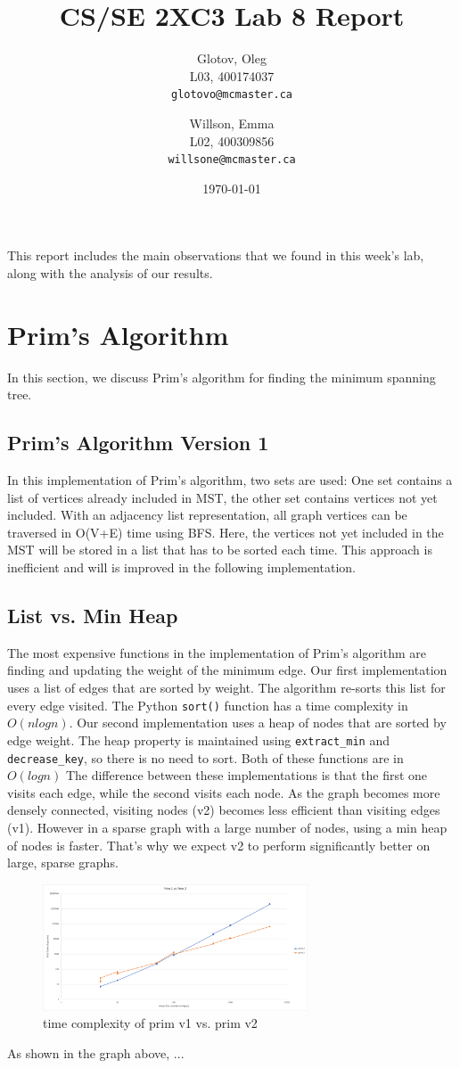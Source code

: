 \documentclass[12pt]{article}
\title{CS/SE 2XC3 Lab 8 Report}
\author{
  Glotov, Oleg\\ L03, 400174037\\
  \texttt{glotovo@mcmaster.ca}
  \and
  Willson, Emma\\ L02, 400309856\\
  \texttt{willsone@mcmaster.ca}
  }
\date{\today}
\begin{document}
\maketitle

This report includes the main observations that we found in this week's lab, along with the analysis of our results.

\newpage 
\section{Prim's Algorithm}
In this section, we discuss Prim's algorithm for finding the minimum spanning tree. 
\subsection{Prim's Algorithm Version 1}
In this implementation of Prim’s algorithm, two sets are used: One set contains a list of vertices already included in MST, the other set contains vertices not yet included. With an adjacency list representation, all graph vertices can be traversed in O(V+E) time using BFS. Here, the vertices not yet included in the MST will be stored in a list that has to be sorted each time. This approach is inefficient and will is improved in the following implementation.
\subsection{List vs. Min Heap}
The most expensive functions in the implementation of Prim's algorithm are finding and updating the weight of the minimum edge. Our first implementation uses a list of edges that are sorted by weight. The algorithm re-sorts this list for every edge visited. The Python \verb+sort()+ function has a time complexity in $O(nlogn)$. Our second implementation uses a heap of nodes that are sorted by edge weight. The heap property is maintained using \verb+extract_min+ and \verb+decrease_key+, so there is no need to sort. Both of these functions are in $O(logn)$ The difference between these implementations is that the first one visits each edge, while the second visits each node. As the graph becomes more densely connected, visiting nodes (v2) becomes less efficient than visiting edges (v1). However in a sparse graph with a large number of nodes, using a min heap of nodes is faster. That's why we expect v2 to perform significantly better on large, sparse graphs.
\begin{figure}[H]
\centering
\includegraphics[width=0.7\textwidth,height=\textheight,keepaspectratio]{prim1and2.png}
\caption{time complexity of prim v1 vs. prim v2}
\label{Figure: m1}
\end{figure}
\noindent As shown in the graph above, ... 
\end{document}

